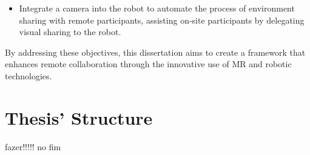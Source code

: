 \begin{itemize}
\begin{itemize}
        \item Integrate a camera into the robot to automate the process of environment sharing with remote participants, assisting on-site participants 
        by delegating visual sharing to the robot.
    \end{itemize}
\end{itemize}

By addressing these objectives, this dissertation aims to create a framework that enhances remote collaboration through the innovative use 
of \ac{MR} and robotic technologies.



\section{Thesis' Structure}
% 
fazer!!!!! no fim 